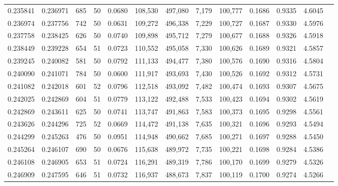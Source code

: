 \begin{tabular}{rrrrrrrrrrrrr}
0.235841 & 0.236971 &   685 &  50 &                                     0.0680 & 108,530 & 497,080 &   7,179 & 100,777 & 0.1686 & 0.9335 & 4.6045 \\
0.236974 & 0.237756 &   742 &  50 &                                     0.0631 & 109,272 & 496,338 &   7,229 & 100,727 & 0.1687 & 0.9330 & 4.5976 \\
0.237758 & 0.238425 &   626 &  50 &                                     0.0740 & 109,898 & 495,712 &   7,279 & 100,677 & 0.1688 & 0.9326 & 4.5918 \\
0.238449 & 0.239228 &   654 &  51 &                                     0.0723 & 110,552 & 495,058 &   7,330 & 100,626 & 0.1689 & 0.9321 & 4.5857 \\
0.239245 & 0.240082 &   581 &  50 &                                     0.0792 & 111,133 & 494,477 &   7,380 & 100,576 & 0.1690 & 0.9316 & 4.5804 \\
0.240090 & 0.241071 &   784 &  50 &                                     0.0600 & 111,917 & 493,693 &   7,430 & 100,526 & 0.1692 & 0.9312 & 4.5731 \\
0.241082 & 0.242018 &   601 &  52 &                                     0.0796 & 112,518 & 493,092 &   7,482 & 100,474 & 0.1693 & 0.9307 & 4.5675 \\
0.242025 & 0.242869 &   604 &  51 &                                     0.0779 & 113,122 & 492,488 &   7,533 & 100,423 & 0.1694 & 0.9302 & 4.5619 \\
0.242869 & 0.243611 &   625 &  50 &                                     0.0741 & 113,747 & 491,863 &   7,583 & 100,373 & 0.1695 & 0.9298 & 4.5561 \\
0.243626 & 0.244296 &   725 &  52 &                                     0.0669 & 114,472 & 491,138 &   7,635 & 100,321 & 0.1696 & 0.9293 & 4.5494 \\
0.244299 & 0.245263 &   476 &  50 &                                     0.0951 & 114,948 & 490,662 &   7,685 & 100,271 & 0.1697 & 0.9288 & 4.5450 \\
0.245264 & 0.246107 &   690 &  50 &                                     0.0676 & 115,638 & 489,972 &   7,735 & 100,221 & 0.1698 & 0.9284 & 4.5386 \\
0.246108 & 0.246905 &   653 &  51 &                                     0.0724 & 116,291 & 489,319 &   7,786 & 100,170 & 0.1699 & 0.9279 & 4.5326 \\
0.246909 & 0.247595 &   646 &  51 &                                     0.0732 & 116,937 & 488,673 &   7,837 & 100,119 & 0.1700 & 0.9274 & 4.5266 \\

\end{tabular}
